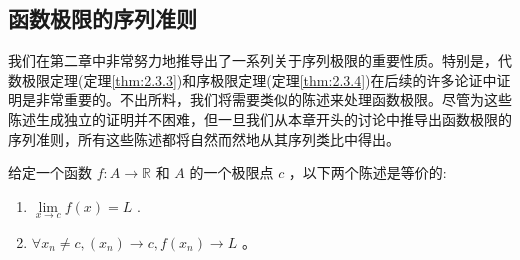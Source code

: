 \subsection{函数极限的序列准则}

我们在第二章中非常努力地推导出了一系列关于序列极限的重要性质。特别是，代数极限定理(定理\ref{thm:2.3.3})和序极限定理(定理\ref{thm:2.3.4})在后续的许多论证中证明是非常重要的。不出所料，我们将需要类似的陈述来处理函数极限。尽管为这些陈述生成独立的证明并不困难，但一旦我们从本章开头的讨论中推导出函数极限的序列准则，所有这些陈述都将自然而然地从其序列类比中得出。

\begin{Thm}[函数极限的序列准则]
  \label{thm:4.2.3}
  给定一个函数 \(f : A \rightarrow  \mathbb{R}\) 和 \(A\) 的一个极限点 \(c\) ，以下两个陈述是等价的:
  \begin{enumerate}[label = (\roman*)]
  \item\label{item:4.2.3} \(\mathop{\lim }\limits_{{x \rightarrow  c}}f\left( x\right)  = L\) .
  \item\label{item:4.2.4}  \(\forall{x}_{n} \neq  c, \left( {x}_{n}\right)  \rightarrow  c, f\left( {x}_{n}\right)  \rightarrow  L\) 。
  \end{enumerate}
\end{Thm}

